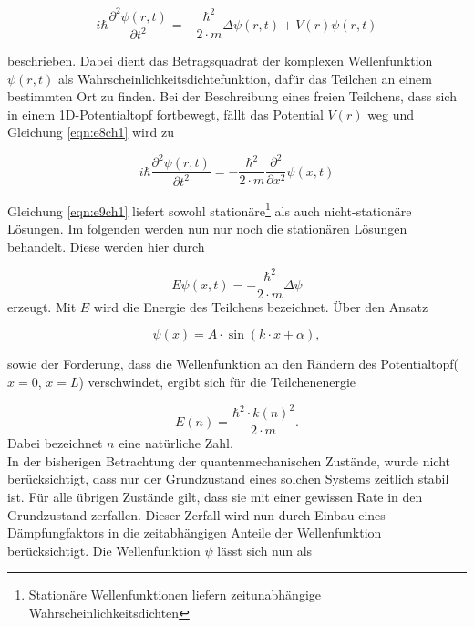 \begin{equation}
  \label{eqn:e8ch1}
  i \hbar \frac{\partial ^2 \psi(r,t)}{\partial  t^2} = -\frac{\hbar^2}{2\cdot m} \Delta  \psi(r,t) + V(r) \psi(r,t)
\end{equation}

beschrieben.
Dabei dient das Betragsquadrat der komplexen Wellenfunktion $\psi(r,t)$
als Wahrscheinlichkeitsdichtefunktion, dafür das Teilchen an
einem bestimmten Ort zu finden.
Bei der Beschreibung eines freien Teilchens, dass sich in einem
1D-Potentialtopf fortbewegt, fällt das Potential $V(r)$
weg und Gleichung \eqref{eqn:e8ch1} wird zu


\begin{equation}
  \label{eqn:e9ch1}
  i \hbar \frac{\partial ^2 \psi(r,t)}{\partial  t^2} = -\frac{\hbar^2}{2\cdot m}
  \frac{\partial ^2}{\partial  x^2} \psi(x, t)
\end{equation}

Gleichung \eqref{eqn:e9ch1} liefert sowohl stationäre\footnote{Stationäre
Wellenfunktionen liefern zeitunabhängige Wahrscheinlichkeitsdichten}
als auch nicht-stationäre Lösungen. Im folgenden werden
nun nur noch die stationären Lösungen behandelt.
Diese werden hier durch


\begin{equation}
  \label{e10ch1}
  E \psi(x,t) = - \frac{\hbar^2}{2 \cdot m} \Delta \psi
\end{equation}
erzeugt. Mit $E$ wird die Energie des Teilchens bezeichnet.
Über den Ansatz


\begin{equation}
  \label{eqn:e11ch1}
  \psi(x) = A \cdot \sin\left( k \cdot x + \alpha \right),
\end{equation}

sowie der Forderung, dass die Wellenfunktion an den Rändern des
Potentialtopf($x = 0$, $x = L$) verschwindet, ergibt sich
für die Teilchenenergie


\begin{equation}
  \label{eqn:e12ch1}
  E(n) = \frac{\hbar^2 \cdot k(n)^2}{2\cdot m}.
\end{equation}
Dabei bezeichnet $n$ eine natürliche Zahl.\\
In der bisherigen Betrachtung der quantenmechanischen Zustände, wurde nicht berücksichtigt, dass
nur der Grundzustand eines solchen Systems zeitlich stabil ist. Für alle übrigen Zustände gilt, dass
sie mit einer gewissen Rate in den Grundzustand zerfallen. Dieser Zerfall wird nun durch Einbau eines Dämpfungfaktors
in die zeitabhängigen Anteile der Wellenfunktion berücksichtigt. Die Wellenfunktion $\psi$ lässt sich nun als



